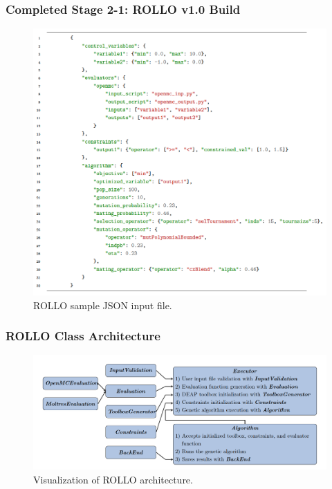 \begin{frame}
    \frametitle{Completed Stage 2-1: ROLLO v1.0 Build}
    \begin{figure}
        \centering
        \includegraphics[width=0.65\linewidth]{figures/rollo-json-input.png} 
        \caption{ROLLO sample JSON input file.}
    \end{figure}
\end{frame}

\begin{frame}
    \frametitle{ROLLO Class Architecture}
    \begin{figure}
        \centering
        \includegraphics[width=\linewidth]{figures/rollo-architecture.png} 
        \caption{Visualization of ROLLO architecture.}
    \end{figure}
\end{frame}